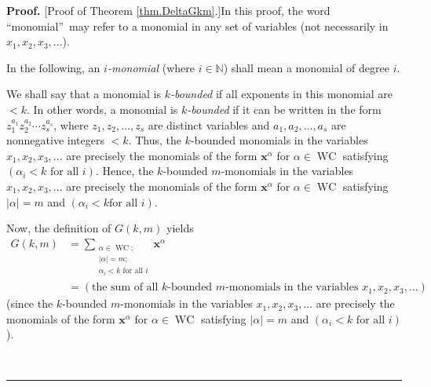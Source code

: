 \documentclass[numbers=enddot,12pt,final,onecolumn,notitlepage]{scrartcl}%
\theoremstyle{definition}
\newenvironment{proof}[1][Proof]{\noindent\textbf{#1.} }{\ \rule{0.5em}{0.5em}}
\let\sumnonlimits\sum
\renewcommand{\sum}{\sumnonlimits\limits}
\begin{document}
\begin{proof}
[Proof of Theorem \ref{thm.DeltaGkm}.]In this proof, the word
\textquotedblleft monomial\textquotedblright\ may refer to a monomial in any
set of variables (not necessarily in $x_{1},x_{2},x_{3},\ldots$).

In the following, an $i$\emph{-monomial} (where $i\in\mathbb{N}$) shall mean a
monomial of degree $i$.

We shall say that a monomial is $k$\emph{-bounded} if all exponents in this
monomial are $<k$. In other words, a monomial is $k$\emph{-bounded} if it can
be written in the form $z_{1}^{a_{1}}z_{2}^{a_{2}}\cdots z_{s}^{a_{s}}$, where
$z_{1},z_{2},\ldots,z_{s}$ are distinct variables and $a_{1},a_{2}%
,\ldots,a_{s}$ are nonnegative integers $<k$. Thus, the $k$-bounded monomials
in the variables $x_{1},x_{2},x_{3},\ldots$ are precisely the monomials of the
form $\mathbf{x}^{\alpha}$ for $\alpha\in\operatorname*{WC}$ satisfying
$\left(  \alpha_{i}<k\text{ for all }i\right)  $. Hence, the $k$-bounded
$m$-monomials in the variables $x_{1},x_{2},x_{3},\ldots$ are precisely the
monomials of the form $\mathbf{x}^{\alpha}$ for $\alpha\in\operatorname*{WC}$
satisfying $\left\vert \alpha\right\vert =m$ and $\left(  \alpha_{i}<k\text{
for all }i\right)  $.

Now, the definition of $G\left(  k,m\right)  $ yields%
\begin{align}
G\left(  k,m\right)   &  =\sum_{\substack{\alpha\in\operatorname*{WC}%
;\\\left\vert \alpha\right\vert =m;\\\alpha_{i}<k\text{ for all }i}%
}\mathbf{x}^{\alpha}\nonumber\\
&  =\left(  \text{the sum of all }k\text{-bounded }m\text{-monomials in the
variables }x_{1},x_{2},x_{3},\ldots\right)  \label{pf.thm.DeltaGkm.Gkm=}%
\end{align}
(since the $k$-bounded $m$-monomials in the variables $x_{1},x_{2}%
,x_{3},\ldots$ are precisely the monomials of the form $\mathbf{x}^{\alpha}$
for $\alpha\in\operatorname*{WC}$ satisfying $\left\vert \alpha\right\vert =m$
and $\left(  \alpha_{i}<k\text{ for all }i\right)  $).


\end{proof}
\end{document}
